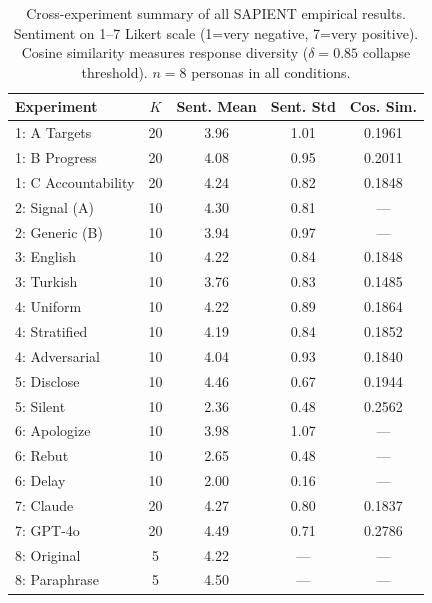 \begin{table}[H]
\centering
\caption{Cross-experiment summary of all SAPIENT empirical results. Sentiment on 1--7
Likert scale (1=very negative, 7=very positive). Cosine similarity measures response
diversity ($\delta=0.85$ collapse threshold). $n=8$ personas in all conditions.}
\label{tab:summary}
\small
\begin{tabular}{@{}lcccc@{}}
\toprule
\textbf{Experiment} & \textbf{$K$} & \textbf{Sent. Mean} & \textbf{Sent. Std} & \textbf{Cos. Sim.} \\
\midrule
    1: A Targets & 20 & 3.96 & 1.01 & 0.1961 \\
    1: B Progress & 20 & 4.08 & 0.95 & 0.2011 \\
    1: C Accountability & 20 & 4.24 & 0.82 & 0.1848 \\
    2: Signal (A) & 10 & 4.30 & 0.81 & --- \\
    2: Generic (B) & 10 & 3.94 & 0.97 & --- \\
    3: English & 10 & 4.22 & 0.84 & 0.1848 \\
    3: Turkish & 10 & 3.76 & 0.83 & 0.1485 \\
    4: Uniform & 10 & 4.22 & 0.89 & 0.1864 \\
    4: Stratified & 10 & 4.19 & 0.84 & 0.1852 \\
    4: Adversarial & 10 & 4.04 & 0.93 & 0.1840 \\
    5: Disclose & 10 & 4.46 & 0.67 & 0.1944 \\
    5: Silent & 10 & 2.36 & 0.48 & 0.2562 \\
    6: Apologize & 10 & 3.98 & 1.07 & --- \\
    6: Rebut & 10 & 2.65 & 0.48 & --- \\
    6: Delay & 10 & 2.00 & 0.16 & --- \\
    7: Claude & 20 & 4.27 & 0.80 & 0.1837 \\
    7: GPT-4o & 20 & 4.49 & 0.71 & 0.2786 \\
    8: Original & 5 & 4.22 & --- & --- \\
    8: Paraphrase & 5 & 4.50 & --- & --- \\
\bottomrule
\end{tabular}
\end{table}


